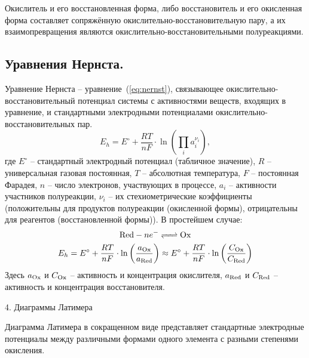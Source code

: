 Окислитель и его восстановленная форма, либо восстановитель и его окисленная форма составляет сопряжённую окислительно-восстановительную пару, а их взаимопревращения являются окислительно-восстановительными полуреакциями.

\subsection{Уравнения Нернста.}

Уравнение Нернста -- уравнение~(\ref{eq:nernst}), связывающее окислительно-восстановительный потенциал системы с активностями веществ, входящих в уравнение, и стандартными электродными потенциалами окислительно-восстановительных пар. 
\begin{equation}
    \label{eq:nernst}
    E_{h} = E^{\circ} + \frac{RT}{nF}\cdot\ln\left(\prod_{i}a_{i}^{\nu_{i}}\right),
\end{equation}
где $E^{\circ}$  -- стандартный электродный потенциал (табличное значение), $R$ -- универсальная газовая постоянная, $T$ -- абсолютная температура, $F$ -- постоянная Фарадея, $n$ -- число электронов, участвующих в процессе, $a_{i}$ --  активности участников полуреакции, $\nu_{i}$ -- их стехиометрические коэффициенты (положительны для продуктов полуреакции (окисленной формы), отрицательны для реагентов (восстановленной формы)). В простейшем случае:
\begin{gather*}
    \ce{Red} - ne^{-} \ce{<=> Ox} \\
    E_{h} = E^{\circ} + \frac{RT}{nF}\cdot\ln\left(\frac{a_{\ce{Ox}}}{a_{\ce{Red}}}\right) \approx E^{\circ} + \frac{RT}{nF}\cdot\ln\left(\frac{C_{\ce{Ox}}}{C_{\ce{Red}}}\right)
\end{gather*}
Здесь $a_{\ce{Ox}}$ и  $C_{\ce{Ox}}$ -- активность и концентрация окислителя,  $a_{\ce{Red}}$ и  $C_{\ce{Red}}$ -- активность и концентрация восстановителя.

4. Диаграммы Латимера 

Диаграмма Латимера в сокращенном виде представляет стандартные электродные потенциалы между различными формами одного элемента с разными степенями окисления. 
